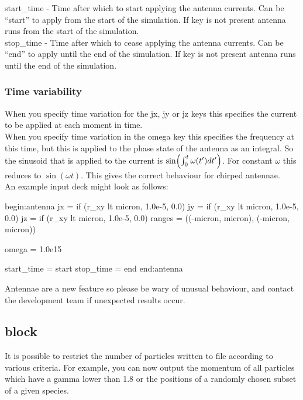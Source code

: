 {\emphtext start\_time} -  Time after which to start applying the antenna
  currents. Can be ``start'' to apply from the start of the simulation. If key
  is not present antenna runs from the start of the simulation.\\

{\emphtext stop\_time} - Time after which to cease applying the antenna
  currents. Can be ``end'' to apply until the end of the simulation. If key is
  not present antenna runs until the end of the simulation.\\

\subsubsection{Time variability}
\label{sec:time_variability}
When you specify time variation for the jx, jy or jz keys this specifies the
 current to be applied at each moment in time.\\

When you specify time variation in the omega key this specifies the frequency
at this time, but this is applied to the phase state of the antenna as an
integral. So the sinusoid that is applied to the current is
$\sin\Bigl(\int_0^t\omega(t')dt'\Bigr)$. For constant $\omega$ this reduces to
$\sin(\omega t)$. This gives the correct behaviour for chirped antennae.\\

An example input deck might look as follows:

\begin{boxverbatim}
begin:antenna
  jx = if (r_xy lt micron, 1.0e-5, 0.0)
  jy = if (r_xy lt micron, 1.0e-5, 0.0)
  jz = if (r_xy lt micron, 1.0e-5, 0.0)
  ranges = ((-micron, micron), (-micron, micron))

  omega = 1.0e15

  start_time = start
  stop_time = end
end:antenna
\end{boxverbatim}

{\emphtext
  Antennae are a new feature so please be wary of unusual behaviour, and
  contact the {\EPOCH} development team if unexpected results occur.}

\subsection{\texorpdfstring
  { block}
  {           {subset} block}}
\label{sec:subset_block}

It is possible to restrict the number of particles written to file
according to various criteria. For example, you can now output the
momentum of all particles which have a gamma lower than 1.8 or the
positions of a randomly chosen subset of a given species.

